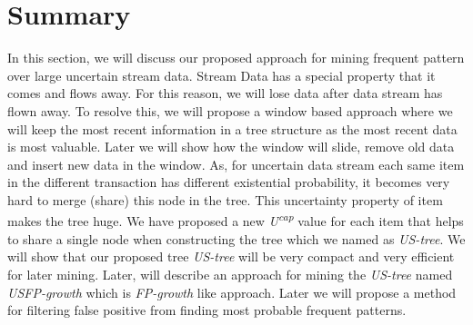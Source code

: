     \section{Summary}
    In this section, we will discuss our proposed approach for mining frequent pattern over large uncertain stream data. Stream Data has a special property that it comes and flows away. For this reason, we will lose data after data stream has flown away. To resolve this, we will propose a window based approach where we will keep the most recent information in a tree structure as the most recent data is most valuable. Later we will show how the window will slide, remove old data and insert new data in the window. As, for uncertain data stream each same item in the different transaction has different existential probability, it becomes very hard to merge (share) this node in the tree. This uncertainty property of item makes the tree huge. We have proposed a new \emph{U\textsuperscript{cap}} value for each item that helps to share a single node when constructing the tree which we named as \emph{US-tree}. We will show that our proposed tree \emph{US-tree} will be very compact and very efficient for later mining. Later, will describe an approach for mining the \emph {US-tree} named \emph{USFP-growth} which is \emph{FP-growth} like approach. Later we will propose a method for filtering false positive from finding most probable frequent patterns.
%
